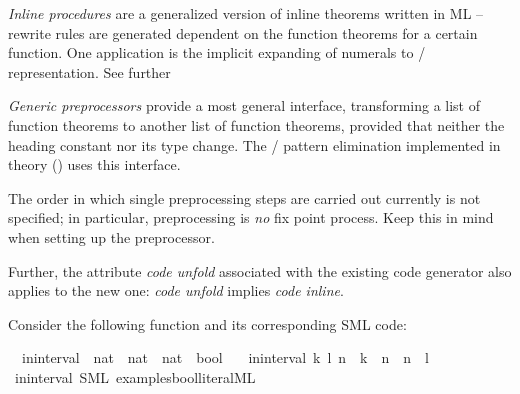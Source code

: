 \begin{isabellebody}
\begin{isamarkuptext}
  \emph{Inline procedures} are a generalized version of inline
  theorems written in ML -- rewrite rules are generated dependent
  on the function theorems for a certain function.  One
  application is the implicit expanding of  numerals
  to  /  representation.  See further

  \emph{Generic preprocessors} provide a most general interface,
  transforming a list of function theorems to another
  list of function theorems, provided that neither the heading
  constant nor its type change.  The  / 
  pattern elimination implemented in
  theory  () uses this
  interface.

  \begin{warn}
    The order in which single preprocessing steps are carried
    out currently is not specified; in particular, preprocessing
    is \emph{no} fix point process.  Keep this in mind when
    setting up the preprocessor.

    Further, the attribute \emph{code unfold}
    associated with the existing code generator also applies to
    the new one: \emph{code unfold} implies \emph{code inline}.
  \end{warn}%
\end{isamarkuptext}%
\isamarkuptrue%
%
\isamarkuptrue%
%
\begin{isamarkuptext}%
Consider the following function and its corresponding
  SML code:%
\end{isamarkuptext}%
\isamarkuptrue%
\isamarkupfalse%
\isanewline
\ \ in{\isacharunderscore}interval\ {\isacharcolon}{\isacharcolon}\ {\isachardoublequoteopen}nat\ {\isasymtimes}\ nat\ {\isasymRightarrow}\ nat\ {\isasymRightarrow}\ bool{\isachardoublequoteclose}\ \isanewline
\ \ {\isachardoublequoteopen}in{\isacharunderscore}interval\ {\isacharparenleft}k{\isacharcomma}\ l{\isacharparenright}\ n\ {\isasymlongleftrightarrow}\ k\ {\isasymle}\ n\ {\isasymand}\ n\ {\isasymle}\ l{\isachardoublequoteclose}%
\isadelimtt
%
\endisadelimtt
%
\isatagtt
%
\endisatagtt
{\isafoldtt}%
%
\isadelimtt
\isanewline
%
\endisadelimtt
{}\isamarkupfalse%
\ in{\isacharunderscore}interval\ {\isacharparenleft}SML\ {\isachardoublequoteopen}examples{\isacharslash}bool{\isacharunderscore}literal{\isachardot}ML{\isachardoublequoteclose}{\isacharparenright}%
\begin{isamarkuptext}%


\end{isamarkuptext}
\end{isabellebody}
